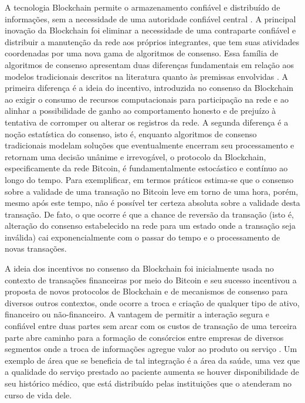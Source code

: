\documentclass[a4paper,11pt]{article}
\begin{document}
A tecnologia Blockchain permite o armazenamento confiável e distribuído de informações, sem a necessidade de uma autoridade confiável central \cite{Swan2015}.
A principal inovação da Blockchain foi eliminar a necessidade de uma contraparte confiável e distribuir a manutenção da rede aos próprios integrantes, que tem suas atividades coordenadas por uma nova gama de algoritmos de consenso.
Essa família de algoritmos de consenso apresentam duas diferenças fundamentais em relação aos modelos tradicionais descritos na literatura quanto às premissas envolvidas \cite{Narayanan2016a}.
A primeira diferença é a ideia do incentivo, introduzida no consenso da Blockchain ao exigir o consumo de recursos computacionais para participação na rede e ao alinhar a possibilidade de ganho ao comportamento honesto e de prejuízo à tentativa de corromper ou alterar os registros da rede.
A segunda diferença é a noção estatística do consenso, isto é, enquanto algoritmos de consenso tradicionais modelam soluções que eventualmente encerram seu processamento e retornam uma decisão unânime e irrevogável, o protocolo da Blockchain, especificamente da rede Bitcoin, é fundamentalmente estocástico e contínuo ao longo do tempo.
Para exemplificar, em termos práticos estima-se que o consenso sobre a validade de uma transação no Bitcoin leve em torno de uma hora, porém, mesmo após este tempo, não é possível ter certeza absoluta sobre a validade desta transação.
De fato, o que ocorre é que a chance de reversão da transação (isto é, alteração do consenso estabelecido na rede para um estado onde a transação seja inválida) cai exponencialmente com o passar do tempo e o processamento de novas transações.


A ideia dos incentivos no consenso da Blockchain foi inicialmente usada no contexto de transações financeiras por meio do Bitcoin \cite{nakamoto2008bitcoin} e seu sucesso incentivou a proposta de novos protocolos de Blockchain e de mecanismos de consenso para diversos outros contextos, onde ocorre a troca e criação de qualquer tipo de ativo, financeiro ou não-financeiro.
A vantagem de permitir a interação segura e confiável entre duas partes sem arcar com os custos de transação de uma terceira parte abre caminho para a formação de consórcios entre empresas de diversos segmentos onde a troca de informações agregue valor ao produto ou serviço \cite{Wust2017}.
Um exemplo de área que se beneficia de tal integração é a área da saúde, uma vez que a qualidade do serviço prestado ao paciente aumenta se houver disponibilidade de seu histórico médico, que está distribuído pelas instituições que o atenderam no curso de vida dele.
\end{document}
